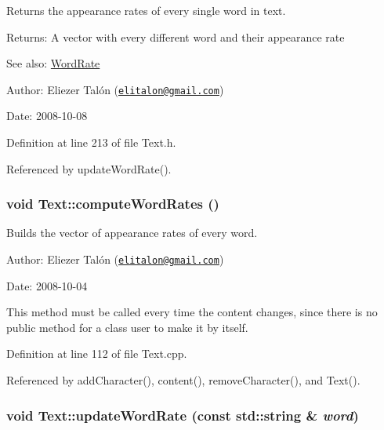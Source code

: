 Returns the appearance rates of every single word in text. 

\begin{Desc}
\item[Returns:]A vector with every different word and their appearance rate\end{Desc}
\begin{Desc}
\item[See also:]\hyperlink{_word_rate_8h_8cfef8793106ac45a83059bd5573cbb3}{WordRate}\end{Desc}
\begin{Desc}
\item[Author:]Eliezer Talón (\href{mailto:elitalon@gmail.com}{\tt elitalon@gmail.com}) \end{Desc}
\begin{Desc}
\item[Date:]2008-10-08 \end{Desc}


Definition at line 213 of file Text.h.

Referenced by updateWordRate().\hypertarget{class_text_8239e13039bcc1c713f66f1236693706}{
\subsubsection[computeWordRates]{\setlength{\rightskip}{0pt plus 5cm}void Text::computeWordRates ()}}
\label{class_text_8239e13039bcc1c713f66f1236693706}


Builds the vector of appearance rates of every word. 

\begin{Desc}
\item[Author:]Eliezer Talón (\href{mailto:elitalon@gmail.com}{\tt elitalon@gmail.com}) \end{Desc}
\begin{Desc}
\item[Date:]2008-10-04\end{Desc}
This method must be called every time the content changes, since there is no public method for a class user to make it by itself. 

Definition at line 112 of file Text.cpp.

Referenced by addCharacter(), content(), removeCharacter(), and Text().\hypertarget{class_text_5ab8f9bfa566de537a167991fe10eff5}{
\subsubsection[updateWordRate]{\setlength{\rightskip}{0pt plus 5cm}void Text::updateWordRate (const std::string \& {\em word})}}
\label{class_text_5ab8f9bfa566de537a167991fe10eff5}


